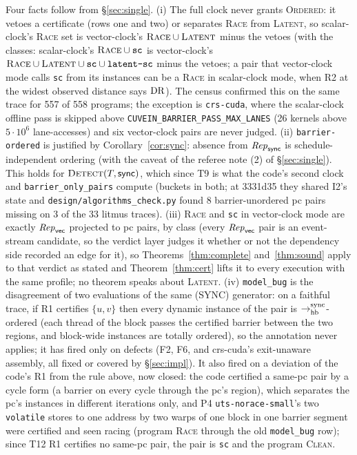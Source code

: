 \documentclass[11pt]{article}
\theoremstyle{remark}
\newcommand{\cls}[1]{\texttt{#1}}\newcommand{\M}{\mathsf{M}}
\begin{document}
Four facts follow from \S\ref{sec:single}. (i) The full clock never grants
\textsc{Ordered}: it vetoes a certificate (rows one and two) or separates \textsc{Race} from
\textsc{Latent}, so scalar-clock's \textsc{Race} set is vector-clock's
$\textsc{Race}\cup\textsc{Latent}$ minus the vetoes (with the classes: scalar-clock's
$\textsc{Race}\cup\cls{sc}$ is vector-clock's $\textsc{Race}\cup\textsc{Latent}\cup\cls{sc}\cup\cls{latent-sc}$
minus the vetoes; a pair that vector-clock mode calls \cls{sc} from its instances can be a
\textsc{Race} in scalar-clock mode, when R2 at the widest observed distance says $\operatorname{DR}$). The census confirmed this on the same
trace for 557 of 558 programs; the exception is \texttt{crs-cuda}, where the scalar-clock
offline pass is skipped above \texttt{CUVEIN\_BARRIER\_PASS\_MAX\_LANES} (26 kernels above
$5\cdot10^{6}$ lane-accesses) and six vector-clock pairs are never judged. (ii)
\cls{barrier-ordered} is justified by Corollary~\ref{cor:sync}: absence from
$\mathit{Rep}_{\mathsf{sync}}$ is schedule-independent ordering (with the caveat of the referee
note (2) of \S\ref{sec:single}). This holds for $\textsc{Detect}(T,\mathsf{sync})$, which
since T9 is what the code's second clock and \texttt{barrier\_only\_pairs} compute (buckets in
both; at 3331d35 they shared I2's state and \texttt{design/algorithms\_check.py} found 8
barrier-unordered pc pairs missing on 3 of the 33 litmus traces). (iii) \textsc{Race} and \cls{sc} in
vector-clock mode are exactly $\mathit{Rep}_{\mathsf{vec}}$ projected to pc pairs, by class (every
$\mathit{Rep}_{\mathsf{vec}}$ pair is an event-stream candidate, so the verdict layer judges it
whether or not the dependency side recorded an edge for it), so
Theorems~\ref{thm:complete} and~\ref{thm:sound} apply to that verdict as stated and
Theorem~\ref{thm:cert} lifts it to every execution with the same profile; no theorem
speaks about \textsc{Latent}. (iv) \cls{model\_bug} is the disagreement of two
evaluations of the same (SYNC) generator: on a faithful trace, if R1 certifies $\{u,v\}$
then every dynamic instance of the pair is $\to_{\mathrm{hb}}^{\mathrm{sync}}$-ordered (each thread of
the block passes the certified barrier between the two regions, and block-wide instances
are totally ordered), so the annotation never applies; it has fired only on defects (F2, F6,
and crs-cuda's exit-unaware assembly, all fixed or covered by \S\ref{sec:impl}). It also fired
on a deviation of the code's R1 from the rule above, now closed: the code certified a same-pc
pair by a cycle form (a barrier on every cycle through the pc's region), which separates the
pc's instances in different iterations only, and P4 \texttt{uts-norace-small}'s two
\texttt{volatile} stores to one address by two warps of one block in one barrier segment were
certified and seen racing (program \textsc{Race} through the old \cls{model\_bug} row); since
T12 R1 certifies no same-pc pair, the pair is \cls{sc} and the program \textsc{Clean}.
\end{document}
